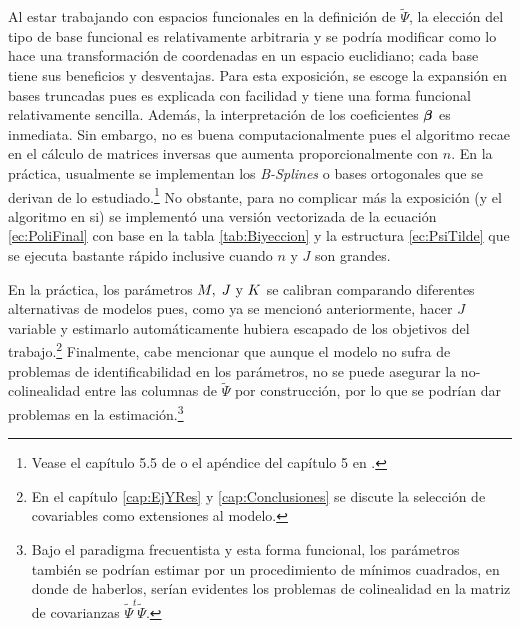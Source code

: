 \documentclass[../Main/Main.tex]{subfiles}
\begin{document}

Al estar trabajando con espacios funcionales en la definición de $\widetilde{\Psi}$, la elección del tipo de base funcional es relativamente arbitraria y se podría modificar como lo hace una transformación de coordenadas en un espacio euclidiano; cada base tiene sus beneficios y desventajas. Para esta exposición, se escoge la expansión en bases truncadas pues es explicada con facilidad y tiene una forma funcional relativamente sencilla. Además, la interpretación de los coeficientes $\bm{\beta}$ es inmediata. Sin embargo, no es buena computacionalmente pues el algoritmo recae en el cálculo de matrices inversas que aumenta proporcionalmente con $n$. En la práctica, usualmente se implementan los \emph{B-Splines} o bases ortogonales que se derivan de lo estudiado.\footnote{Vease el capítulo 5.5 de \citet{wasserman2007all} o el apéndice del capítulo 5 en \citet{hastie2008elements}.} No obstante, para no complicar más la exposición (y el algoritmo en si) se implementó una versión vectorizada de la ecuación \eqref{ec:PoliFinal} con base en la tabla \ref{tab:Biyeccion} y la estructura \eqref{ec:PsiTilde} que se ejecuta bastante rápido inclusive cuando $n$ y $J$ son grandes.

En la práctica, los parámetros $M,\;J\text{ y }K$ se calibran comparando diferentes alternativas de modelos pues, como ya se mencionó anteriormente, hacer $J$ variable y estimarlo automáticamente hubiera escapado de los objetivos del trabajo.\footnote{En el capítulo \ref{cap:EjYRes} y \ref{cap:Conclusiones} se discute la selección de covariables como extensiones al modelo.} Finalmente, cabe mencionar que aunque el modelo no sufra de problemas de identificabilidad en los parámetros, no se puede asegurar la no-colinealidad entre las columnas de $\widetilde{\Psi}$ por construcción, por lo que se podrían dar problemas en la estimación.\footnote{Bajo el paradigma frecuentista y esta forma funcional, los parámetros también se podrían estimar por un procedimiento de mínimos cuadrados, en donde de haberlos, serían evidentes los problemas de colinealidad en la matriz de covarianzas $\widetilde\Psi^t\widetilde\Psi$.}
\end{document}
